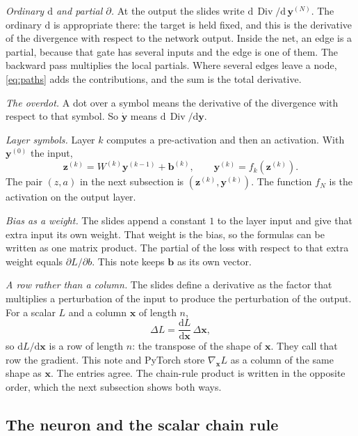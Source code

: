 \documentclass[11pt]{article}
\begin{document}
\emph{Ordinary $\mathrm{d}$ and partial $\partial$.} At the output the slides write $\mathrm{d}\,\operatorname{Div}/\mathrm{d}\,\mathbf{y}^{(N)}$. The ordinary $\mathrm{d}$ is appropriate there: the target is held fixed, and this is the derivative of the divergence with respect to the network output. Inside the net, an edge is a partial, because that gate has several inputs and the edge is one of them. The backward pass multiplies the local partials. Where several edges leave a node, \eqref{eq:paths} adds the contributions, and the sum is the total derivative.

\emph{The overdot.} A dot over a symbol means the derivative of the divergence with respect to that symbol. So $\dot{\mathbf{y}}$ means $\mathrm{d}\,\operatorname{Div}/\mathrm{d}\mathbf{y}$.

\emph{Layer symbols.} Layer $k$ computes a pre-activation and then an activation. With $\mathbf{y}^{(0)}$ the input,
\begin{equation}
\mathbf{z}^{(k)}=W^{(k)}\mathbf{y}^{(k-1)}+\mathbf{b}^{(k)},
\qquad
\mathbf{y}^{(k)}=f_k(\mathbf{z}^{(k)}).
\end{equation}
The pair $(z,a)$ in the next subsection is $(\mathbf{z}^{(k)},\mathbf{y}^{(k)})$. The function $f_N$ is the activation on the output layer.

\emph{Bias as a weight.} The slides append a constant $1$ to the layer input and give that extra input its own weight. That weight is the bias, so the formulas can be written as one matrix product. The partial of the loss with respect to that extra weight equals $\partial L/\partial b$. This note keeps $\mathbf{b}$ as its own vector.

\emph{A row rather than a column.} The slides define a derivative as the factor that multiplies a perturbation of the input to produce the perturbation of the output. For a scalar $L$ and a column $\mathbf{x}$ of length $n$,
\begin{equation}
\Delta L=\frac{\mathrm{d}L}{\mathrm{d}\mathbf{x}}\,\Delta\mathbf{x},
\end{equation}
so $\mathrm{d}L/\mathrm{d}\mathbf{x}$ is a row of length $n$: the transpose of the shape of $\mathbf{x}$. They call that row the gradient. This note and PyTorch store $\nabla_{\mathbf{x}}L$ as a column of the same shape as $\mathbf{x}$. The entries agree. The chain-rule product is written in the opposite order, which the next subsection shows both ways.

\subsection{The neuron and the scalar chain rule}
\end{document}
